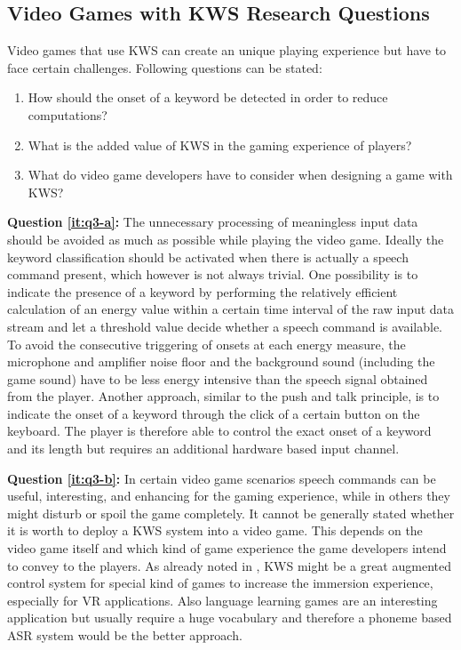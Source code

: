 \subsection{Video Games with KWS Research Questions}\label{sec:intro_rq_games}
Video games that use KWS can create an unique playing experience but have to face certain challenges.
Following questions can be stated:
\begin{enumerate}[label={Q.3.\alph*)}, leftmargin=1.75cm]
  \item How should the onset of a keyword be detected in order to reduce computations?\label{it:q3-a}
  \item What is the added value of KWS in the gaming experience of players?\label{it:q3-b}
  \item What do video game developers have to consider when designing a game with KWS?\label{it:q3-c}
\end{enumerate}
\noindent
\textbf{Question \ref{it:q3-a}:} 
The unnecessary processing of meaningless input data should be avoided as much as possible while playing the video game.
Ideally the keyword classification should be activated when there is actually a speech command present, which however is not always trivial.
One possibility is to indicate the presence of a keyword by performing the relatively efficient calculation of an energy value within a certain time interval of the raw input data stream and let a threshold value decide whether a speech command is available.
To avoid the consecutive triggering of onsets at each energy measure, the microphone and amplifier noise floor and the background sound (including the game sound) have to be less energy intensive than the speech signal obtained from the player.
Another approach, similar to the push and talk principle, is to indicate the onset of a keyword through the click of a certain button on the keyboard.
The player is therefore able to control the exact onset of a keyword and its length but requires an additional hardware based input channel.

\textbf{Question \ref{it:q3-b}:}
In certain video game scenarios speech commands can be useful, interesting, and enhancing for the gaming experience, while in others they might disturb or spoil the game completely.
It cannot be generally stated whether it is worth to deploy a KWS system into a video game.
This depends on the video game itself and which kind of game experience the game developers intend to convey to the players.
As already noted in , KWS might be a great augmented control system for special kind of games to increase the immersion experience, especially for VR applications.
Also language learning games are an interesting application but usually require a huge vocabulary and therefore a phoneme based ASR system would be the better approach.

